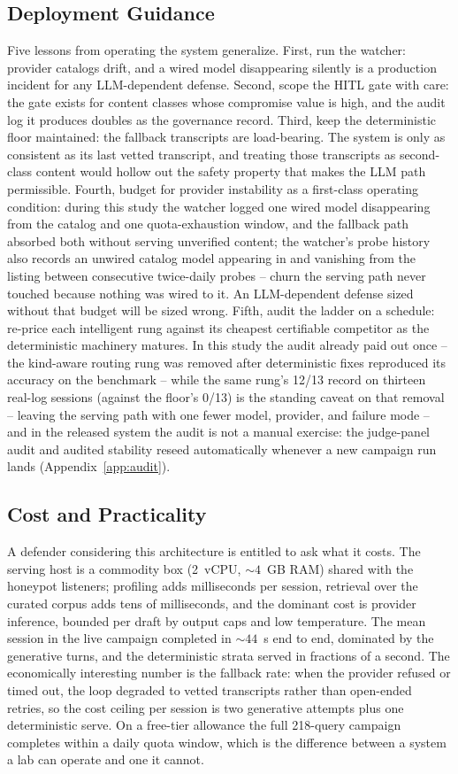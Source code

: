 \subsection{Deployment Guidance}
Five lessons from operating the system generalize. First, run the
watcher: provider catalogs drift, and a wired model disappearing silently
is a production incident for any LLM-dependent defense. Second, scope the
HITL gate with care: the gate exists for content classes whose
compromise value is high, and the audit log it produces doubles as the
governance record. Third, keep the deterministic floor maintained: the
fallback transcripts are load-bearing. The system is only as consistent
as its last vetted transcript, and treating those transcripts as second-class
content would hollow out the safety property that makes the LLM path
permissible. Fourth, budget for provider instability as a first-class
operating condition: during this study the watcher logged one wired model
disappearing from the catalog and one quota-exhaustion window, and the
fallback path absorbed both without serving unverified content; the
watcher's probe history also records an unwired catalog model appearing
in and vanishing from the listing between consecutive twice-daily
probes -- churn the serving path never touched because nothing was
wired to it. An
LLM-dependent defense sized without that budget will be sized wrong.
Fifth, audit the ladder on a schedule: re-price each intelligent rung
against its cheapest certifiable competitor as the deterministic
machinery matures. In this study the audit already paid out once --the kind-aware routing rung was removed after deterministic fixes reproduced
its accuracy on the benchmark -- while the same rung's 12/13 record on
thirteen real-log sessions (against the floor's 0/13) is the standing
caveat on that removal -- leaving the serving path with one fewer model,
provider, and failure mode -- and in the released system the audit is
not a manual exercise: the judge-panel audit and audited stability
reseed automatically whenever a new campaign run lands (Appendix~\ref{app:audit}).

\subsection{Cost and Practicality}
A defender considering this architecture is entitled to ask what it costs.
The serving host is a commodity box (2~vCPU, ${\sim}4$~GB RAM) shared with
the honeypot listeners; profiling adds milliseconds per session, retrieval
over the curated corpus adds tens of milliseconds, and the dominant cost
is provider inference, bounded per draft by output caps and low
temperature. The mean session in the live campaign completed in
${\sim}44$~s end to end, dominated by the generative turns, and the
deterministic strata served in fractions of a second. The economically
interesting number is the fallback rate: when the provider refused or
timed out, the loop degraded to vetted transcripts rather than
open-ended retries, so the cost ceiling per session is two generative
attempts plus one deterministic serve. On a free-tier allowance the full
218-query campaign completes within a daily quota window, which is the
difference between a system a lab can operate and one it cannot.

